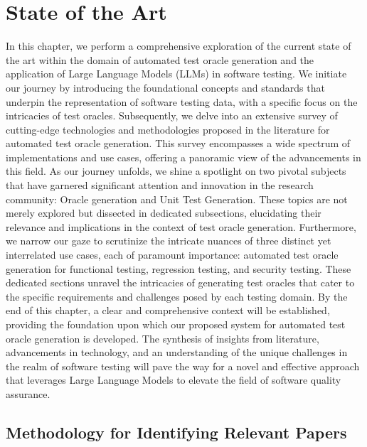 \chapter{State of the Art}
\label{cha:state_of_the_art}
\vspace{0.4 cm}

In this chapter, we perform a comprehensive exploration of the current state of the art within the domain of automated test oracle generation and the application of Large Language Models (LLMs) in software testing. We initiate our journey by introducing the foundational concepts and standards that underpin the representation of software testing data, with a specific focus on the intricacies of test oracles. Subsequently, we delve into an extensive survey of cutting-edge technologies and methodologies proposed in the literature for automated test oracle generation. This survey encompasses a wide spectrum of implementations and use cases, offering a panoramic view of the advancements in this field. As our journey unfolds, we shine a spotlight on two pivotal subjects that have garnered significant attention and innovation in the research community: Oracle generation and Unit Test Generation. These topics are not merely explored but dissected in dedicated subsections, elucidating their relevance and implications in the context of test oracle generation. Furthermore, we narrow our gaze to scrutinize the intricate nuances of three distinct yet interrelated use cases, each of paramount importance: automated test oracle generation for functional testing, regression testing, and security testing. These dedicated sections unravel the intricacies of generating test oracles that cater to the specific requirements and challenges posed by each testing domain. By the end of this chapter, a clear and comprehensive context will be established, providing the foundation upon which our proposed system for automated test oracle generation is developed. The synthesis of insights from literature, advancements in technology, and an understanding of the unique challenges in the realm of software testing will pave the way for a novel and effective approach that leverages Large Language Models to elevate the field of software quality assurance.


\section{Methodology for Identifying Relevant Papers}
\label{sec:papaer_survey_methodology}
\vspace{0.2 cm}

